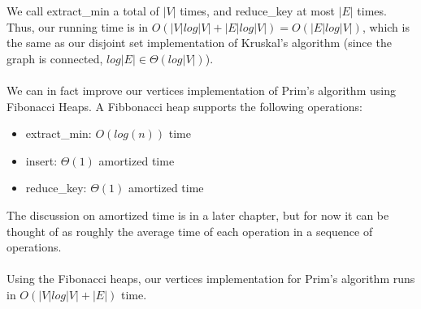 \documentclass[a4paper]{article}
\begin{document}
We call extract\_min a total of $|V|$ times, and reduce\_key at most $|E|$ times. Thus, our running time is in $O(|V|log|V| + |E|log|V|) = O(|E| log|V|)$, which is the same as our disjoint set implementation of Kruskal's algorithm (since the graph is connected, $log|E| \in \Theta(log|V|)$).\\\\
We can in fact improve our vertices implementation of Prim's algorithm using Fibonacci Heaps. A Fibbonacci heap supports the following operations:
\begin{itemize}
	\itemsep0em
	\item extract\_min: $O(log(n))$ time
	\item insert: $\Theta(1)$ amortized time
	\item reduce\_key: $\Theta(1)$ amortized time
\end{itemize}
The discussion on amortized time is in a later chapter, but for now it can be thought of as roughly the average time of each operation in a sequence of operations.\\\\
Using the Fibonacci heaps, our vertices implementation for Prim's algorithm runs in $O(|V|log|V|+|E|)$ time.
\end{document}
